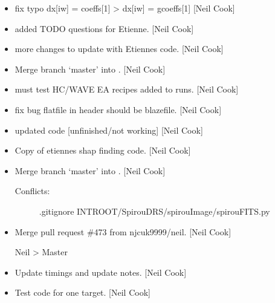 \documentclass[a4paper,10pt,english]{report}
\begin{document}
\label{\detokenize{misc/changelog:id326}}\begin{itemize}
\item {} 
 \sphinxhyphen{} fix typo dx{[}iw{]} = coeffs{[}1{]} \textendash{}\textgreater{} dx{[}iw{]} =
gcoeffs{[}1{]} {[}Neil Cook{]}

\item {} 
 \sphinxhyphen{} added TODO questions for Etienne. {[}Neil Cook{]}

\item {} 
 \sphinxhyphen{} more changes to update with Etiennes
 code. {[}Neil Cook{]}

\item {} 
Merge branch ‘master’ into . {[}Neil Cook{]}

\item {} 
 \sphinxhyphen{} must test HC/WAVE EA recipes \sphinxhyphen{} added to runs. {[}Neil
Cook{]}

\item {} 
 \sphinxhyphen{} fix bug flatfile in header should be
blazefile. {[}Neil Cook{]}

\item {} 
 \sphinxhyphen{} updated code {[}unfinished/not working{]} {[}Neil
Cook{]}

\item {} 
Copy of etiennes shap finding code. {[}Neil Cook{]}

\item {} 
Merge branch ‘master’ into . {[}Neil Cook{]}
\begin{description}
\item[{Conflicts:}] \leavevmode
.gitignore
INTROOT/SpirouDRS/spirouImage/spirouFITS.py

\end{description}

\item {} 
Merge pull request \#473 from njcuk9999/neil. {[}Neil Cook{]}

Neil \textendash{}\textgreater{} Master

\item {} 
Update timings and update notes. {[}Neil Cook{]}

\item {} 
Test code for one target. {[}Neil Cook{]}


\end{itemize}
\end{document}
